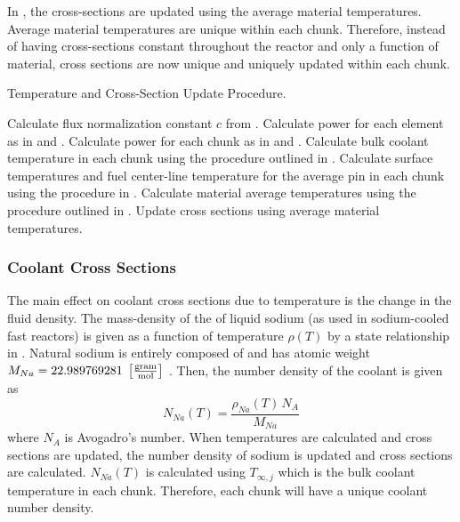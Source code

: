     In , the cross-sections are
    updated using the average material temperatures. Average material
    temperatures are unique within each chunk. Therefore, instead of having
    cross-sections constant throughout the reactor and only a function of
    material, cross sections are now unique and uniquely updated within each
    chunk.

    \begin{algorithm}
      \caption{Temperature and Cross-Section Update Procedure.}
      \label{algorithm:temperature_update}
      \begin{algorithmic}[1]
        \State Calculate flux normalization constant $c$ from
          .
        \State Calculate power for each element as in  and
          .
        \State Calculate power for each chunk as in  and
          .
        \State Calculate bulk coolant temperature in each chunk using the 
          procedure outlined in .
        \State Calculate surface temperatures and fuel center-line temperature
          for the average pin in each chunk using the procedure in 
          .
        \State Calculate material average temperatures using the procedure 
          outlined in .
        \State Update cross sections using average material temperatures.
      \end{algorithmic}
    \end{algorithm}

    \subsubsection{Coolant Cross Sections}
      The main effect on coolant cross sections due to temperature is the change
      in the fluid density. The mass-density of the of liquid sodium (as used in
      sodium-cooled fast reactors) is given as a function of temperature
      $\rho(T)$ by a state relationship in \cite{sodiumProp}. Natural sodium is
      entirely composed of  and has atomic weight $M_{Na} =
      22.989769281 \;\left[\text{{$\frac{\text{gram}}{\text{mol}}$}}\right]$ \cite{nuclides}.
      Then, the number density of the coolant is given as
      \begin{equation}
        \label{eq:number_density_sodium}
        N_{Na}(T) = \frac{\rho_{Na}(T) \, N_A}{M_{Na}}
      \end{equation}
      where $N_A$ is Avogadro's number. When temperatures are calculated and
      cross sections are updated, the number density of sodium is updated and
      cross sections are calculated. $N_{Na}(T)$ is calculated using
      $T_{\infty,j}$ which is the bulk coolant temperature in each chunk.
      Therefore, each chunk will have a unique coolant number density.
      
